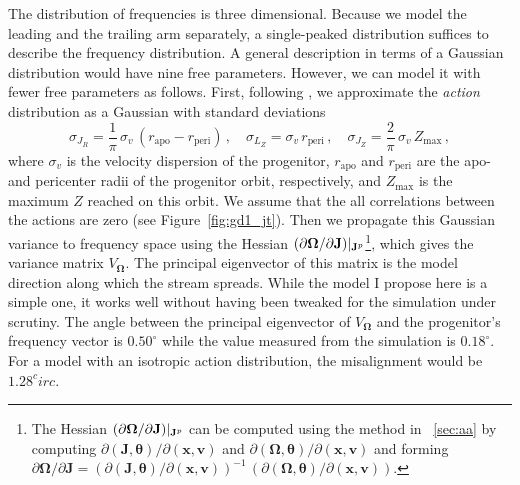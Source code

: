 \documentclass[12pt,preprint]{aastex}
\renewcommand{\figurename}{Figure}
\renewcommand{\vec}[1]{\ensuremath{\mathbf{#1}}}
\newcommand{\vecx}{\ensuremath{\vec{x}}}
\newcommand{\vecv}{\ensuremath{\vec{v}}}
\newcommand{\vecj}{\ensuremath{\vec{J}}}
\newcommand{\veco}{\ensuremath{\vec{\Omega}}}
\newcommand{\veca}{\ensuremath{\boldsymbol\theta}}
\newcommand{\sigv}{\ensuremath{\sigma_v}}
\begin{document}
The distribution of frequencies is three dimensional. Because we model
the leading and the trailing arm separately, a single-peaked
distribution suffices to describe the frequency distribution. A
general description in terms of a Gaussian distribution would have
nine free parameters. However, we can model it with fewer free
parameters as follows. First, following \citet{Eyre11a}, we
approximate the \emph{action} distribution as a Gaussian with standard
deviations
\begin{equation}
  \sigma_{J_R} = \frac{1}{\pi}\,\sigv\,\left(r_{\mathrm{apo}}-r_{\mathrm{peri}}\right)\,,\quad 
  \sigma_{L_Z} = \sigv\,r_{\mathrm{peri}}\,,\quad 
  \sigma_{J_Z} = \frac{2}{\pi}\,\sigv\,Z_{\mathrm{max}}\,,
\end{equation}
where $\sigv$ is the velocity dispersion of the progenitor,
$r_{\mathrm{apo}}$ and $r_{\mathrm{peri}}$ are the apo- and pericenter
radii of the progenitor orbit, respectively, and $Z_{\mathrm{max}}$ is
the maximum $Z$ reached on this orbit. We assume that the all
correlations between the actions are zero (see
\figurename~\ref{fig:gd1_jt}). Then we propagate this Gaussian
variance to frequency space using the Hessian $(\partial \veco /
\partial \vecj)\large|_{\vecj^p}$\footnote{The Hessian $(\partial
  \veco / \partial \vecj)\large|_{\vecj^p}$ can be computed using the
  method in \appendixname~\ref{sec:aa} by computing $\partial
  (\vecj,\veca) / \partial (\vecx,\vecv)$ and $\partial (\veco,\veca)
  / \partial (\vecx,\vecv)$ and forming $\partial \veco / \partial
  \vecj = \left(\partial (\vecj,\veca) / \partial
  (\vecx,\vecv)\right)^{-1}\,\left(\partial (\veco,\veca) / \partial
  (\vecx,\vecv)\right)$.}, which gives the variance matrix
$V_\veco$. The principal eigenvector of this matrix is the model
direction along which the stream spreads. While the model I propose
here is a simple one, it works well without having been tweaked for
the simulation under scrutiny. The angle between the principal
eigenvector of $V_\veco$ and the progenitor's frequency vector is
$0.50^\circ$ while the value measured from the simulation is
$0.18^\circ$. For a model with an isotropic action distribution, the
misalignment would be $1.28^circ$.
\end{document}
